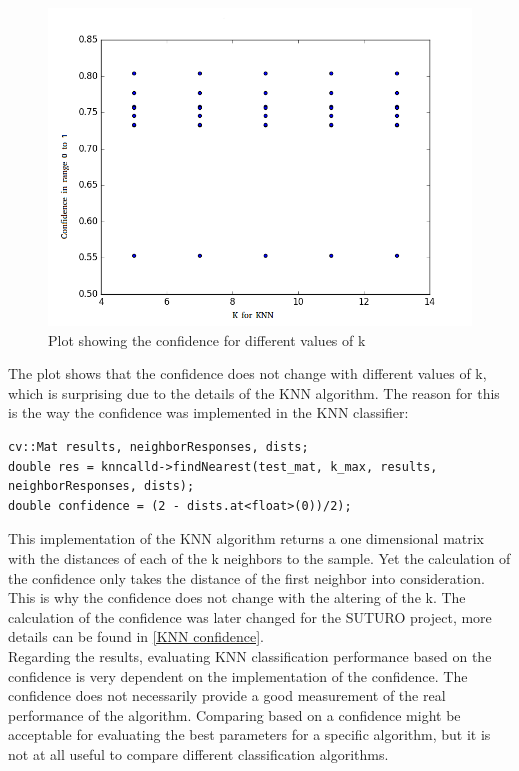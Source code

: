 \documentclass[main.tex]{subfiles}
\begin{document}
\begin{figure}
    \includegraphics[width=\textwidth]{pictures/perception/k_comparison.png}
    \caption{Plot showing the confidence for different values of k}
    \label{fig:k comparison plot}
\end{figure}

The plot shows that the confidence does not change with different values of k, which is surprising due to the details of the KNN algorithm. The reason for this is the way the confidence was implemented in the KNN classifier:

\begin{lstlisting}
cv::Mat results, neighborResponses, dists;
double res = knncalld->findNearest(test_mat, k_max, results, neighborResponses, dists);
double confidence = (2 - dists.at<float>(0))/2);
\end{lstlisting}

This implementation of the KNN algorithm returns a one dimensional matrix with the distances of each of the k neighbors to the sample. Yet the calculation of the confidence only takes the distance of the first neighbor into consideration. This is why the confidence does not change with the altering of the k. The calculation of the confidence was later changed for the SUTURO project, more details can be found in \ref{KNN confidence}.\\

Regarding the results, evaluating KNN classification performance based on the confidence is very dependent on the implementation of the confidence. The confidence does not necessarily provide a good measurement of the real performance of the algorithm. Comparing based on a confidence might be acceptable for evaluating the best parameters for a specific algorithm, but it is not at all useful to compare different classification algorithms.\\
\end{document}
